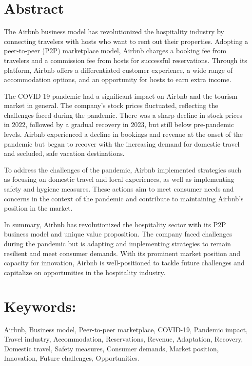 \documentclass{article}
\begin{document}
\section*{Abstract}
The Airbnb business model has revolutionized the hospitality industry by connecting travelers with hosts who want to rent out their properties. Adopting a peer-to-peer (P2P) marketplace model, Airbnb charges a booking fee from travelers and a commission fee from hosts for successful reservations. Through its platform, Airbnb offers a differentiated customer experience, a wide range of accommodation options, and an opportunity for hosts to earn extra income.

The COVID-19 pandemic had a significant impact on Airbnb and the tourism market in general. The company's stock prices fluctuated, reflecting the challenges faced during the pandemic. There was a sharp decline in stock prices in 2022, followed by a gradual recovery in 2023, but still below pre-pandemic levels. Airbnb experienced a decline in bookings and revenue at the onset of the pandemic but began to recover with the increasing demand for domestic travel and secluded, safe vacation destinations.

To address the challenges of the pandemic, Airbnb implemented strategies such as focusing on domestic travel and local experiences, as well as implementing safety and hygiene measures. These actions aim to meet consumer needs and concerns in the context of the pandemic and contribute to maintaining Airbnb's position in the market.

In summary, Airbnb has revolutionized the hospitality sector with its P2P business model and unique value proposition. The company faced challenges during the pandemic but is adapting and implementing strategies to remain resilient and meet consumer demands. With its prominent market position and capacity for innovation, Airbnb is well-positioned to tackle future challenges and capitalize on opportunities in the hospitality industry.
\vspace{1cm}
\onehalfspacing

\section*{Keywords:}
Airbnb, Business model, Peer-to-peer marketplace, COVID-19, Pandemic impact, Travel industry, Accommodation, Reservations, Revenue, Adaptation, Recovery, Domestic travel, Safety measures, Consumer demands, Market position, Innovation, Future challenges, Opportunities.
\vspace{1cm}
\onehalfspacing
\end{document}
